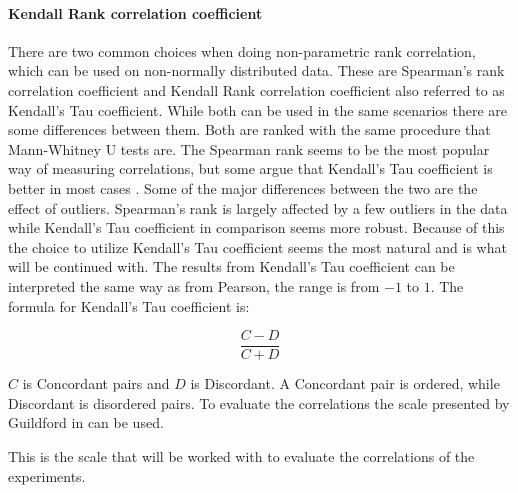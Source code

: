 \paragraph{Kendall Rank correlation coefficient}
There are two common choices when doing non-parametric rank correlation, which can be used on non-normally distributed data. These are Spearman's rank correlation coefficient and Kendall Rank correlation coefficient also referred to as Kendall's Tau coefficient\cite*[]{han1987non}. While both can be used in the same scenarios there are some differences between them. Both are ranked with the same procedure that Mann-Whitney U tests are. The Spearman rank seems to be the most popular way of measuring correlations, but some argue that Kendall's Tau coefficient is better in most cases \cite{gilpin1993table}. Some of the major differences between the two are the effect of outliers. Spearman's rank is largely affected by a few outliers in the data while Kendall's Tau coefficient in comparison seems more robust. Because of this the choice to utilize Kendall's Tau coefficient seems the most natural and is what will be continued with. The results from Kendall's Tau coefficient can be interpreted the same way as from Pearson, the range is from $-1$ to $1$. The formula for Kendall's Tau coefficient is:

\begin{equation}
    \frac{C-D}{C+D}
\end{equation}

$C$ is Concordant pairs and $D$ is Discordant. A Concordant pair is ordered, while Discordant is disordered pairs\cite{kendall1938new}. To evaluate the correlations the scale presented by Guildford in \cite[219]{guilford1950fundamental} can be used.



This is the scale that will be worked with to evaluate the correlations of the experiments.

